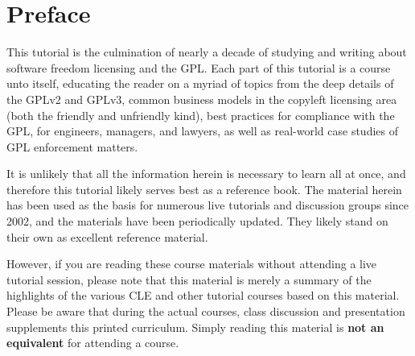 \documentclass[10pt, letterpaper, openany, oneside]{book}
\begin{document}
\tableofcontents

\chapter{Preface}

This tutorial is the culmination of nearly a decade of studying and writing
about software freedom licensing and the GPL\@.  Each part of this tutorial
is a course unto itself, educating the reader on a myriad of topics from the
deep details of the GPLv2 and GPLv3, common business models in the copyleft
licensing area (both the friendly and unfriendly kind), best practices for
compliance with the GPL, for engineers, managers, and lawyers, as well as
real-world case studies of GPL enforcement matters.

It is unlikely that all the information herein is necessary to learn all at
once, and therefore this tutorial likely serves best as a reference book.
The material herein has been used as the basis for numerous live tutorials
and discussion groups since 2002, and the materials have been periodically
updated.   They likely stand on their own as excellent reference material.

However, if you are reading these course materials without attending a live
tutorial session, please note that this material is merely a summary of the
highlights of the various CLE and other tutorial courses based on this
material.  Please be aware that during the actual courses, class discussion
and presentation supplements this printed curriculum.  Simply reading this
material is \textbf{not an equivalent} for attending a course.

\mainmatter







\appendix


\end{document}
